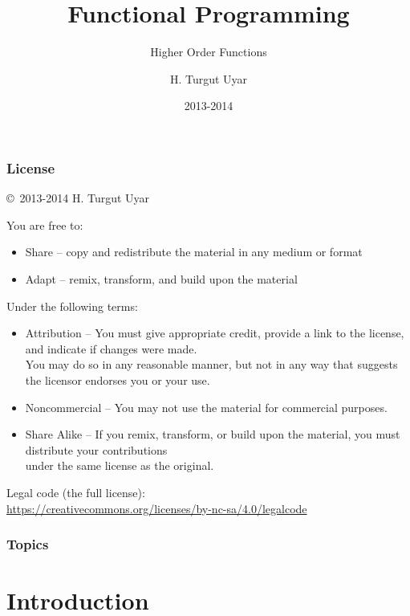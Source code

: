 \documentclass[dvipsnames]{beamer}
\title{Functional Programming}
\subtitle{Higher Order Functions}
\author{H. Turgut Uyar}
\date{2013-2014}
\theoremstyle{plain}
\begin{document}

\begin{frame}
  \titlepage
\end{frame}

\begin{frame}
  \frametitle{License}

  \hfill
  \copyright~2013-2014 H. Turgut Uyar

  \vfill
  \begin{tiny}
    You are free to:
    \begin{itemize}
      \item Share -- copy and redistribute the material in any medium or format
      \item Adapt -- remix, transform, and build upon the material
    \end{itemize}

    Under the following terms:
    \begin{itemize}
      \item Attribution -- You must give appropriate credit, provide a link to
        the license, and indicate if changes were made.\\
        You may do so in any reasonable manner, but not in any way
        that suggests the licensor endorses you or your use.

      \item Noncommercial -- You may not use the material for commercial
        purposes.

      \item Share Alike -- If you remix, transform, or build upon the material,
        you must distribute your contributions\\
        under the same license as the original.
    \end{itemize}
  \end{tiny}

  \vfill
  \begin{small}
    Legal code (the full license):\\
    \url{https://creativecommons.org/licenses/by-nc-sa/4.0/legalcode}
  \end{small}
\end{frame}

\begin{frame}
  \frametitle{Topics}
  \tableofcontents
\end{frame}

\section{Introduction}
\end{document}
